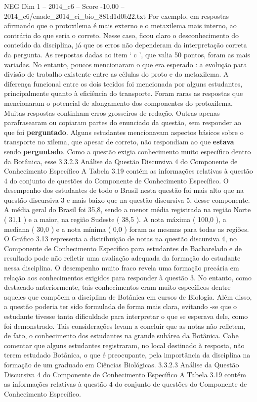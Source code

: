 \begin{textsample}{NEG Dim 1 – 2014\_c6 – Score -10.00 – 2014\_c6/enade\_2014\_ci\_bio\_881d1d0b22.txt}
Por exemplo, em respostas afirmando que o protoxilema é mais externo e o metaxilema mais interno, ao contrário do que seria o correto.
Nesse caso, ficou claro o desconhecimento do conteúdo da disciplina, já que os erros não dependeram da interpretação correta da pergunta.
As respostas dadas ao item ‘ c ’, que valia 50 pontos, foram as mais variadas.
No entanto, poucos mencionaram o que era esperado : a evolução para divisão de trabalho existente entre as células do proto e do metaxilema.
A diferença funcional entre os dois tecidos foi mencionada por alguns estudantes, principalmente quanto à eficiência do transporte.
Foram raras as respostas que mencionaram o potencial de alongamento dos componentes do protoxilema.
Muitas respostas continham erros grosseiros de redação.
Outras apenas parafrasearam ou copiaram partes do enunciado da questão, sem responder ao que foi \textbf{perguntado}.
Alguns estudantes mencionavam aspectos básicos sobre o transporte no xilema, que apesar de correto, não respondiam ao que \textbf{estava} sendo \textbf{perguntado}.
Como a questão exigia conhecimento muito específico dentro da Botânica, esse 3.3.2.3 Análise da Questão Discursiva 4 do Componente de Conhecimento Específico A Tabela 3.19 contém as informações relativas à questão 4 do conjunto de questões do Componente de Conhecimento Específico.
O desempenho dos estudantes de todo o Brasil nesta questão foi mais alto que na questão discursiva 3 e mais baixo que na questão discursiva 5, desse componente.
A média geral do Brasil foi 35,8, sendo a menor média registrada na região Norte ( 31,1 ) e a maior, na região Sudeste ( 38,5 ).
A nota máxima ( 100,0 ), a mediana ( 30,0 ) e a nota mínima ( 0,0 ) foram as mesmas para todas as regiões.
O Gráfico 3.13 representa a distribuição de notas na questão discursiva 4, no Componente de Conhecimento Específico para estudantes de Bacharelado e de resultado pode não refletir uma avaliação adequada da formação do estudante nessa disciplina.
O desempenho muito fraco revela uma formação precária em relação aos conhecimentos exigidos para responder à questão 3.
No entanto, como destacado anteriormente, tais conhecimentos eram muito específicos dentre aqueles que compõem a disciplina de Botânica em cursos de Biologia.
Além disso, a questão poderia ter sido formulada de forma mais clara, evitando -se que o estudante tivesse tanta dificuldade para interpretar o que se esperava dele, como foi demonstrado.
Tais considerações levam a concluir que as notas não refletem, de fato, o conhecimento dos estudantes na grande subárea da Botânica.
Cabe comentar que alguns estudantes registraram, no local destinado à resposta, não terem estudado Botânica, o que é preocupante, pela importância da disciplina na formação de um graduado em Ciências Biológicas. 3.3.2.3 Análise da Questão Discursiva 4 do Componente de Conhecimento Específico A Tabela 3.19 contém as informações relativas à questão 4 do conjunto de questões do Componente de Conhecimento Específico.

\end{textsample}
